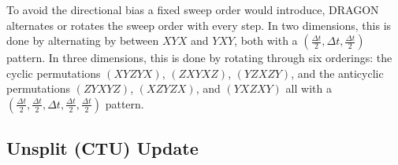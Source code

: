 \documentclass[11pt]{report}
\begin{document}
To avoid the directional bias a fixed sweep order would introduce, DRAGON alternates or rotates the sweep order with every step.
In two dimensions, this is done by alternating by between $XYX$ and $YXY$, both with a $(\frac{\Delta t}{2}, \Delta t, \frac{\Delta t}{2})$ pattern. 
In three dimensions, this is done by rotating through six orderings: the cyclic permutations $(XYZYX)$, $(ZXYXZ)$, $(YZXZY)$, and the anticyclic permutations $(ZYXYZ)$, $(XZYZX)$, and $(YXZXY)$ all with a $(\frac{\Delta t}{2}, \frac{\Delta t}{2}, \Delta t, \frac{\Delta t}{2},\frac{\Delta t}{2})$ pattern. 

 
 
 \subsection{Unsplit (CTU) Update}
\label{sec:unsplit}
\end{document}
